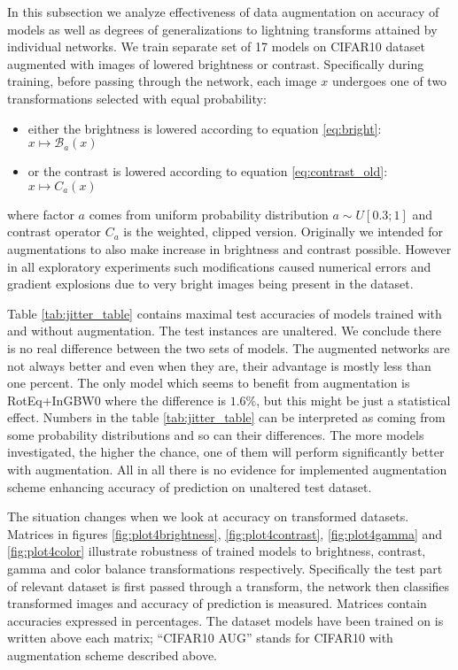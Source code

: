     In this subsection we analyze effectiveness of data augmentation on accuracy
    of models as well as degrees of generalizations to lightning transforms
    attained by individual networks.
    We train separate set of 17 models on CIFAR10 dataset augmented with images
    of lowered brightness or contrast. Specifically during training,
    before passing through the network, each image $x$
    undergoes one of two transformations selected with equal probability:
    \begin{itemize}
        \item either the brightness is lowered according to
            equation \ref{eq:bright}: $x \mapsto \mathcal{B}_a(x)$
        \item or the contrast is lowered according to equation
            \ref{eq:contrast_old}: $x \mapsto C_a(x)$
    \end{itemize}
    where factor $a$ comes from uniform probability distribution
    $a \sim U[0.3; 1]$ and contrast operator $C_a$ is the weighted, clipped version.
    Originally we intended for augmentations to also make increase in brightness
    and contrast possible. However in all exploratory experiments
    such modifications caused
    numerical errors and gradient explosions due to very bright images being
    present in the dataset.

    Table \ref{tab:jitter_table} contains maximal test accuracies of
    models trained with and without augmentation.
    The test instances are unaltered.
    We conclude there is no real difference
    between the two sets of models. The augmented networks are not always better
    and even when they are, their advantage is mostly less than one percent. The
    only model which seems to benefit from augmentation is RotEq+InGBW0 where
    the difference is $1.6\%$, but this might be just a statistical effect. Numbers
    in the table \ref{tab:jitter_table} can be interpreted as coming
    from some probability distributions
    and so can their differences. The more models investigated, the higher the
    chance, one of them will perform significantly better with augmentation. All
    in all there is no evidence for implemented augmentation scheme enhancing
    accuracy of prediction on unaltered test dataset.

    The situation changes when we look at accuracy on transformed datasets.
    Matrices in figures \ref{fig:plot4brightness}, \ref{fig:plot4contrast},
    \ref{fig:plot4gamma} and \ref{fig:plot4color} illustrate robustness of trained
    models to brightness, contrast, gamma and color balance transformations
    respectively. Specifically the test part of relevant dataset is first passed through
    a transform, the network then classifies transformed images and accuracy of
    prediction is measured. Matrices contain accuracies expressed in percentages.
    The dataset models have been trained on is written above each matrix;
    ``CIFAR10 AUG'' stands for CIFAR10 with augmentation scheme described above.

